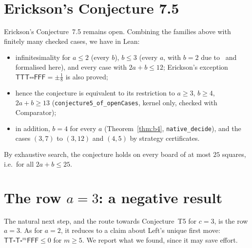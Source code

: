 \documentclass[11pt,a4paper]{article}
\newcommand{\Tt}{\mathsf{T}}
\newcommand{\Ff}{\mathsf{F}}
\newcommand{\E}{\square}
\newcommand{\lean}[1]{\texttt{#1}}
\theoremstyle{plain}
\theoremstyle{remark}
\begin{document}
\section{Erickson's Conjecture 7.5}\label{sec:erickson}

Erickson's Conjecture~7.5 remains open. Combining the families above with finitely many checked
cases, we have in Lean:
\begin{itemize}
\item infinitesimality for $a\le2$ (every $b$), $b\le3$ (every $a$, with $b=2$ due
  to~\cite{T11} and formalised here), and every case with $2a+b\le12$; Erickson's exception
  $\Tt\Tt\Tt\E\E\Ff\Ff\Ff=\pm\frac18$ is also proved;
\item hence the conjecture is equivalent to its restriction to $a\ge3$, $b\ge4$, $2a+b\ge13$
  (\lean{conjecture5\_of\_openCases}, kernel only, checked with Comparator);
\item in addition, $b=4$ for every $a$ (Theorem~\ref{thm:b4}, \lean{native\_decide}), and the cases
  $(3,7)$ to $(3,12)$ and $(4,5)$ by strategy certificates.
\end{itemize}
By exhaustive search, the conjecture holds on every board of at most $25$ squares, i.e.\ for all
$2a+b\le25$.

\section{The row \texorpdfstring{$a=3$}{a=3}: a negative result}\label{sec:a3}

The natural next step, and the route towards Conjecture~T5 for $c=3$, is the row $a=3$. As for
$a=2$, it reduces to a claim about Left's unique first move: $\Tt\Tt\E\Tt\E^m\Ff\Ff\Ff\le0$ for
$m\ge5$. We report what we found, since it may save effort.
\end{document}
